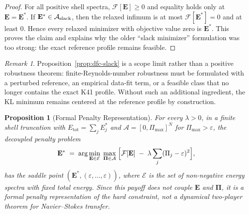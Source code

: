 \documentclass[12pt,a4paper]{article}
\theoremstyle{definition}
\theoremstyle{plain}
\newtheorem{proposition}[definition]{Proposition}
\theoremstyle{remark}
\newtheorem{remark}[definition]{Remark}
\begin{document}
\begin{proof}
For all positive shell spectra, $\mathcal{F}[\mathbf{E}]\ge0$ and equality
holds only at $\mathbf{E}=\mathbf{E}^*$.  If
$\mathbf{E}^*\in\mathcal{A}_{\textup{slack}}$, then the relaxed infimum is
at most $\mathcal{F}[\mathbf{E}^*]=0$ and at least $0$.  Hence every
relaxed minimizer with objective value zero is $\mathbf{E}^*$.  This proves
the claim and explains why the older ``slack minimizer'' formulation was
too strong: the exact reference profile remains feasible.
\end{proof}

\begin{remark}
Proposition~\ref{prop:dfc-slack} is a scope limit rather than a positive
robustness theorem: finite-Reynolds-number robustness must be formulated
with a perturbed reference, an empirical data-fit term, or a feasible class
that no longer contains the exact K41 profile.  Without such an additional
ingredient, the KL minimum remains centered at the reference profile by construction.
\end{remark}

\begin{proposition}[Formal Penalty Representation]
\label{prop:minimax}
For every $\lambda>0$, in a finite shell truncation with
$E_{\mathrm{tot}}=\sum_jE_j^*$ and
$\mathcal{A}=[0,\Pi_{\max}]^N$ for $\Pi_{\max}>\varepsilon$, the
decoupled penalty problem
\begin{equation}\label{eq:minimax}
  \mathbf{E}^*
  \;=\;
  \arg\min_{\mathbf{E} \in \mathcal{E}}\;
  \max_{\boldsymbol{\Pi} \in \mathcal{A}}\;
  \Bigl[
    \mathcal{F}[\mathbf{E}]
    \;-\;
    \lambda \sum_j (\Pi_j - \varepsilon)^2
  \Bigr],
\end{equation}
has the saddle point
$(\mathbf{E}^*,(\varepsilon,\ldots,\varepsilon))$, where
$\mathcal{E}$ is the set of non-negative energy spectra with fixed total
energy.  Since this payoff does not couple $\mathbf{E}$ and
$\boldsymbol{\Pi}$, it is a formal penalty representation of the hard
constraint, not a dynamical two-player theorem for Navier--Stokes transfer.
\end{proposition}
\end{document}
